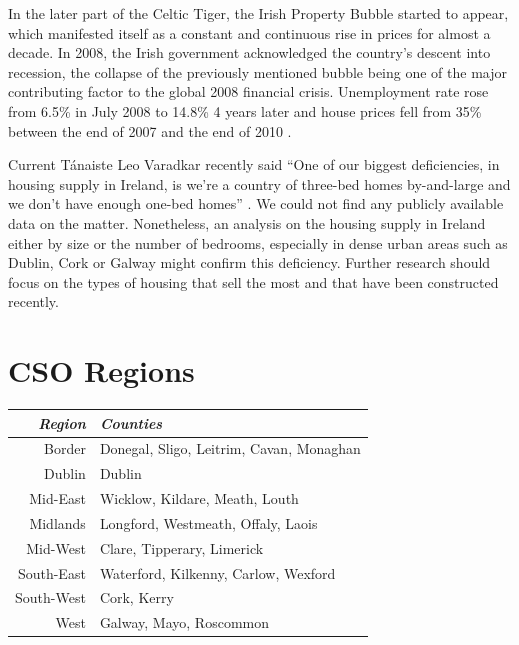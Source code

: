 \documentclass[twocolumn]{article}
\begin{document}
In the later part of the Celtic Tiger, the Irish Property Bubble started
to appear, which manifested itself as a constant and continuous rise in prices
for almost a decade. In 2008, the Irish government acknowledged the country's
descent into recession\cite{kollewe08}, the collapse
of the previously mentioned bubble being one of the major contributing factor
to the global 2008 financial crisis. Unemployment rate rose from 6.5\% in July
2008 to 14.8\% 4 years later \cite{cso14} and house prices fell from 35\%
between the end of 2007 and the end of 2010 \cite{environ10}.

Current Tánaiste Leo Varadkar recently said ``One of our biggest
deficiencies, in housing supply in Ireland, is we're a country of three-bed
homes by-and-large and we don't have enough one-bed homes'' \cite{mcgrath21}. We
could not find any publicly available data on the matter. Nonetheless, an
analysis on the housing supply in Ireland either by size or the number of
bedrooms, especially in dense urban areas such as Dublin, Cork or Galway might
confirm this deficiency. Further research should focus on the types of housing
that sell the most and that have been constructed recently.


\raggedright

\appendix
\section{CSO Regions\label{a:regions}}
\begin{tabularx}{0.5\textwidth}{r X}
    \textit{Region} & \textit{Counties} \\ \hline
    Border & Donegal, Sligo, Leitrim, Cavan, Monaghan\\ \hline
    Dublin & Dublin\\ \hline
    Mid-East & Wicklow, Kildare, Meath, Louth\\ \hline
    Midlands & Longford, Westmeath, Offaly, Laois\\ \hline
    Mid-West & Clare, Tipperary, Limerick\\ \hline
    South-East & Waterford, Kilkenny, Carlow, Wexford\\ \hline
    South-West & Cork, Kerry\\ \hline
    West & Galway, Mayo, Roscommon
\end{tabularx}
\end{document}
